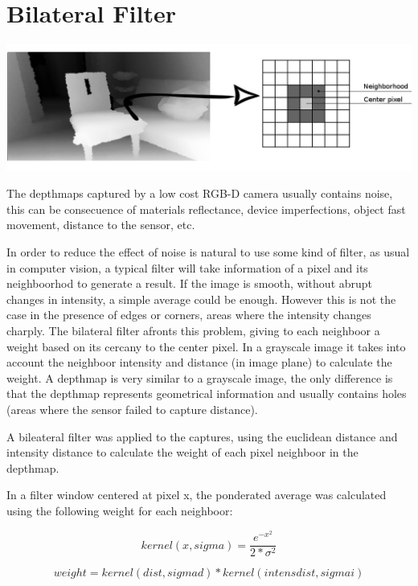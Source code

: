 \section{Bilateral Filter}

\begin{center}
\includegraphics[scale=0.25]{images/vecindarioDepth}
\end{center}

The depthmaps captured by a low cost RGB-D camera usually contains noise, this can be 
consecuence of materials reflectance, device imperfections, object fast movement, distance to the 
sensor, etc. 

In order to reduce the effect of noise is natural to use some kind of filter, as usual in computer 
vision, a typical filter will take information of a pixel and its neighboorhod to generate a result. 
If the image is smooth, without abrupt changes in intensity, a simple average could be enough. However this 
is not the case in the presence of edges or corners, areas where the intensity changes charply. 
The bilateral filter afronts this problem, giving to each neighboor a weight based on its cercany  
to the center pixel. In a grayscale image it takes into account 
the neighboor intensity and distance (in image plane) to calculate the weight. A depthmap is very similar to a grayscale 
image, the only difference is that the depthmap represents geometrical information and usually contains holes 
(areas where the sensor failed to capture distance). 


A bileateral filter was applied to the captures, using the euclidean distance and intensity distance to calculate 
the weight of each pixel neighboor in the depthmap.

In a filter window centered at pixel x, the ponderated average was calculated using the following weight for each neighboor:

$$ kernel(x,sigma) = \frac{e^{-x^2}}{2*\sigma^2} $$

$$ weight = kernel(dist,sigmad)*kernel(intensdist,sigmai) $$

